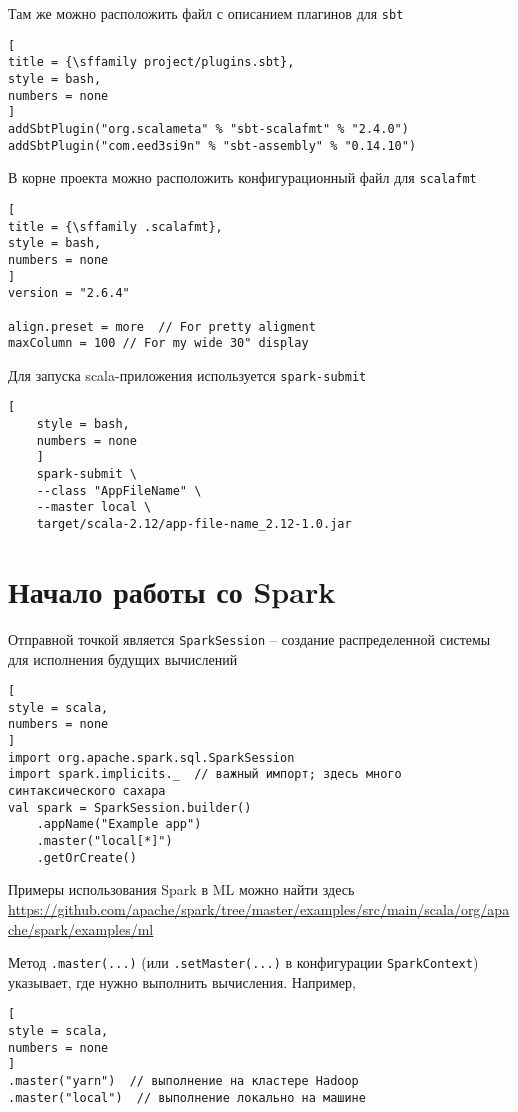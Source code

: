 \documentclass[%
	11pt,
	a4paper,
	utf8,
		]{article}
\begin{document}
Там же можно расположить файл с описанием плагинов для \texttt{sbt}
\begin{lstlisting}[
title = {\sffamily project/plugins.sbt},
style = bash,
numbers = none	
]
addSbtPlugin("org.scalameta" % "sbt-scalafmt" % "2.4.0")
addSbtPlugin("com.eed3si9n" % "sbt-assembly" % "0.14.10")
\end{lstlisting}

В корне проекта можно расположить конфигурационный файл для \texttt{scalafmt}
\begin{lstlisting}[
title = {\sffamily .scalafmt},
style = bash,
numbers = none	
]
version = "2.6.4"

align.preset = more  // For pretty aligment
maxColumn = 100 // For my wide 30" display
\end{lstlisting}

Для запуска scala-приложения используется \texttt{spark-submit}
\begin{lstlisting}[
	style = bash,
	numbers = none	
	]
	spark-submit \
	--class "AppFileName" \
	--master local \
	target/scala-2.12/app-file-name_2.12-1.0.jar
\end{lstlisting}




\section{Начало работы со Spark}

Отправной точкой является \texttt{SparkSession} -- создание распределенной системы для исполнения будущих вычислений
\begin{lstlisting}[
style = scala,
numbers = none	
]
import org.apache.spark.sql.SparkSession
import spark.implicits._  // важный импорт; здесь много синтаксического сахара
val spark = SparkSession.builder()
    .appName("Example app")
    .master("local[*]")
    .getOrCreate()
\end{lstlisting}

Примеры использования Spark в ML можно найти здесь \url{https://github.com/apache/spark/tree/master/examples/src/main/scala/org/apache/spark/examples/ml}

Метод \texttt{.master(...)} (или \texttt{.setMaster(...)} в конфигурации \texttt{SparkContext}) указывает, где нужно выполнить вычисления. Например,
\begin{lstlisting}[
style = scala,
numbers = none
]
.master("yarn")  // выполнение на кластере Hadoop
.master("local")  // выполнение локально на машине
\end{lstlisting}
\end{document}
